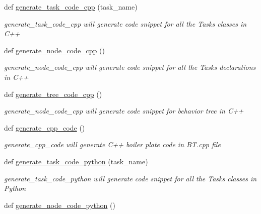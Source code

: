 \begin{DoxyCompactItemize}
def \mbox{\hyperlink{namespace_b_t_code_generator_a66ace159dbed0899e297cc547dbc66b8}{generate\+\_\+task\+\_\+code\+\_\+cpp}} (task\+\_\+name)
\begin{DoxyCompactList}\small\item\em \textquotesingle{}generate\+\_\+task\+\_\+code\+\_\+cpp\textquotesingle{} will generate code snippet for all the Tasks classes in C++ \end{DoxyCompactList}\item 
def \mbox{\hyperlink{namespace_b_t_code_generator_a09267bf563df55b448e406996022b3b1}{generate\+\_\+node\+\_\+code\+\_\+cpp}} ()
\begin{DoxyCompactList}\small\item\em \textquotesingle{}generate\+\_\+node\+\_\+code\+\_\+cpp\textquotesingle{} will generate code snippet for all the Tasks declarations in C++ \end{DoxyCompactList}\item 
def \mbox{\hyperlink{namespace_b_t_code_generator_ae2b1a20feb20638408a088323dedb2d2}{generate\+\_\+tree\+\_\+code\+\_\+cpp}} ()
\begin{DoxyCompactList}\small\item\em \textquotesingle{}generate\+\_\+node\+\_\+code\+\_\+cpp\textquotesingle{} will generate code snippet for behavior tree in C++ \end{DoxyCompactList}\item 
def \mbox{\hyperlink{namespace_b_t_code_generator_a30d522de4346ccb225624302e9f8759f}{generate\+\_\+cpp\+\_\+code}} ()
\begin{DoxyCompactList}\small\item\em \textquotesingle{}generate\+\_\+cpp\+\_\+code\textquotesingle{} will generate C++ boiler plate code in \textquotesingle{}B\+T.\+cpp\textquotesingle{} file \end{DoxyCompactList}\item 
def \mbox{\hyperlink{namespace_b_t_code_generator_ab9d9b9738c0d565484f12231bc202158}{generate\+\_\+task\+\_\+code\+\_\+python}} (task\+\_\+name)
\begin{DoxyCompactList}\small\item\em \textquotesingle{}generate\+\_\+task\+\_\+code\+\_\+python\textquotesingle{} will generate code snippet for all the Tasks classes in Python \end{DoxyCompactList}\item 
def \mbox{\hyperlink{namespace_b_t_code_generator_a7bea8f87522fb1e2ea09694dd1eae7eb}{generate\+\_\+node\+\_\+code\+\_\+python}} ()

\end{DoxyCompactItemize}
